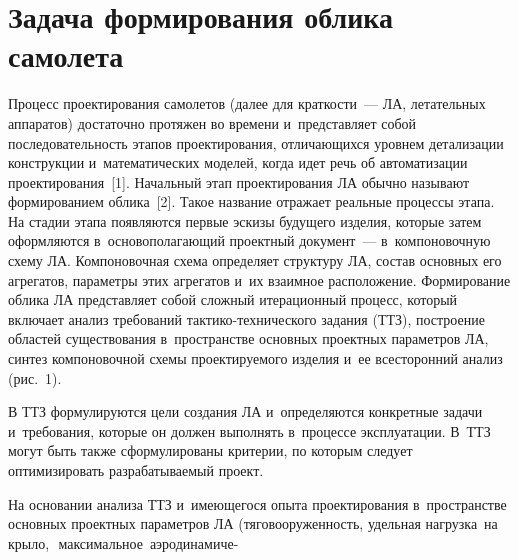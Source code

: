 
  



\thispagestyle{headings}

\begin{multicols}{2}

\label{st\stat}
  
\section{Задача формирования облика самолета}


  Процесс проектирования самолетов (далее для краткости~--- ЛА, 
летательных аппаратов) достаточно протяжен во времени и~представляет собой\linebreak 
последовательность этапов проектирования, отличающихся уровнем 
детализации конструкции и~математических моделей, когда идет речь об 
автоматизации проектирования~[1]. 
Начальный этап \mbox{проектирования} ЛА 
обычно называют формированием облика~[2]. Такое название отражает 
реальные процессы этапа. На стадии этапа появляются первые эскизы будущего 
изделия, которые \mbox{затем} оформляются в~основополагающий проектный 
документ~--- в~компоновочную схему ЛА. Компоновочная схема определяет 
структуру ЛА, состав основных его агрегатов, параметры этих агрегатов и~их 
взаимное расположение. Формирование облика ЛА представляет собой 
сложный итерационный процесс, который включает анализ требований  
так\-ти\-ко-тех\-ни\-че\-ско\-го задания (ТТЗ), построение областей 
существования в~пространстве основных проектных параметров ЛА, синтез 
компоновочной схемы проектируемого изделия и~ее всесторонний анализ 
(рис.~1). 



  В ТТЗ формулируются цели создания ЛА и~определяются конкретные задачи 
и~требования, которые он должен выполнять в~процессе эксплуатации. В~ТТЗ 
могут быть также сформулированы критерии, по которым следует 
оптимизировать разрабатываемый проект. 

На основании анализа ТТЗ 
и~имеющегося опыта проектирования в~пространстве основных проектных 
параметров ЛА (тяговооруженность, удельная на\-груз\-ка\, на\, крыло,\,\, 
максимальное\, аэродинамиче-  %



\end{multicols}
  
